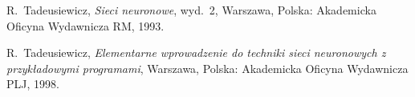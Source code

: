 \documentclass[journal]{IEEEtran}
\begin{document}

%


\ifCLASSOPTIONcaptionsoff
  \newpage
\fi




%
%
%
\begin{thebibliography}{1}

R.~Tadeusiewicz, \emph{Sieci neuronowe}, wyd.~2, Warszawa, Polska: Akademicka
Oficyna Wydawnicza RM, 1993.

R.~Tadeusiewicz, \emph{Elementarne wprowadzenie do techniki sieci neuronowych
z przykładowymi programami}, Warszawa, Polska: Akademicka Oficyna Wydawnicza PLJ, 1998.


\end{thebibliography}
\end{document}
